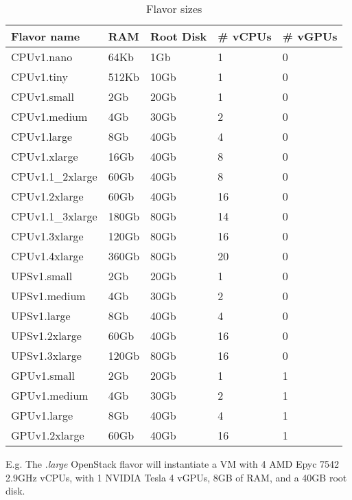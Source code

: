 \begin{table}[h!]
\centering
\begin{tabular}{ |p{3cm}|p{3cm}|p{3cm}|p{3cm}|p{3cm}| }
  \hline
  \rowcolor{lightgray} \textbf{Flavor name} & \textbf{RAM} & \textbf{Root Disk} & \textbf{# vCPUs} & \textbf{# vGPUs} \\
  \hline
  CPUv1.nano & 64Kb & 1Gb & 1 & 0 \\
  \hline
  CPUv1.tiny & 512Kb & 10Gb & 1 & 0 \\
  \hline
  CPUv1.small & 2Gb & 20Gb & 1 & 0 \\
  \hline
  CPUv1.medium & 4Gb & 30Gb & 2 & 0 \\
  \hline
  CPUv1.large & 8Gb & 40Gb & 4 & 0 \\
  \hline
  CPUv1.xlarge & 16Gb & 40Gb & 8 & 0 \\
  \hline
  CPUv1.1_2xlarge & 60Gb & 40Gb & 8 & 0 \\
  \hline
  CPUv1.2xlarge & 60Gb & 40Gb & 16 & 0 \\  
  \hline
  CPUv1.1_3xlarge & 180Gb & 80Gb & 14 & 0 \\
  \hline
  CPUv1.3xlarge & 120Gb & 80Gb & 16 & 0 \\
  \hline
  CPUv1.4xlarge & 360Gb & 80Gb & 20 & 0 \\
  \hline
  UPSv1.small & 2Gb & 20Gb & 1 & 0 \\
  \hline
  UPSv1.medium & 4Gb & 30Gb & 2 & 0 \\
  \hline
  UPSv1.large & 8Gb & 40Gb & 4 & 0 \\
  \hline
  UPSv1.2xlarge & 60Gb & 40Gb & 16 & 0 \\
  \hline
  UPSv1.3xlarge & 120Gb & 80Gb & 16 & 0 \\
  \hline
  GPUv1.small & 2Gb & 20Gb & 1 & 1 \\
  \hline
  GPUv1.medium & 4Gb & 30Gb & 2 & 1 \\
  \hline
  GPUv1.large & 8Gb & 40Gb & 4 & 1 \\
  \hline
  GPUv1.2xlarge & 60Gb & 40Gb & 16 & 1 \\
  \hline
\end{tabular}
\caption{Flavor sizes}
\label{table:flavor-size}
\end{table}


E.g. The .\emph{large} OpenStack flavor will instantiate a
VM with 4 AMD Epyc 7542 2.9GHz vCPUs, with 1 NVIDIA Tesla 4 vGPUs, 8GB
of RAM, and a 40GB root disk.


